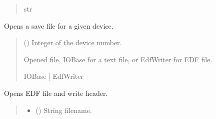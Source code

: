 \documentclass[letterpaper,10pt,english]{sphinxmanual}
\begin{document}
\begin{fulllineitems}
\begin{fulllineitems}
\begin{quote}
\begin{description}
\sphinxAtStartPar
str

\end{description}\end{quote}

\end{fulllineitems}


\begin{fulllineitems}
\label{\detokenize{Setup_PodInterface:Setup_PodInterface.Setup_Interface._OpenSaveFile}}
\pysigstartsignatures
{}
\pysigstopsignatures
\sphinxAtStartPar
Opens a save file for a given device.
\begin{quote}\begin{description}
\sphinxAtStartPar
{} () \textendash{} Integer of the device number.

\sphinxAtStartPar
Opened file. IOBase for a text file, or EdfWriter for EDF file.

\sphinxAtStartPar
IOBase | EdfWriter

\end{description}\end{quote}

\end{fulllineitems}


\begin{fulllineitems}
\label{\detokenize{Setup_PodInterface:Setup_PodInterface.Setup_Interface._OpenSaveFile_EDF}}
\pysigstartsignatures
{}
\pysigstopsignatures
\sphinxAtStartPar
Opens EDF file and write header.
\begin{quote}\begin{description}
\begin{itemize}
\item {} 
\sphinxAtStartPar
{} () \textendash{} String filename.


\end{itemize}
\end{description}
\end{quote}
\end{fulllineitems}
\end{fulllineitems}
\end{document}
